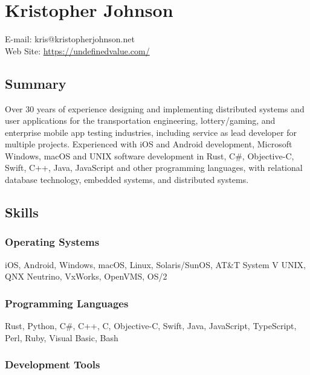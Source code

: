 \hypertarget{kristopher-johnson}{%
\section{Kristopher Johnson}\label{kristopher-johnson}}

E-mail: kris@kristopherjohnson.net\\
Web Site: \url{https://undefinedvalue.com/}

\hypertarget{summary}{%
\subsection{Summary}\label{summary}}

Over 30 years of experience designing and implementing distributed
systems and user applications for the transportation engineering,
lottery/gaming, and enterprise mobile app testing industries, including
service as lead developer for multiple projects. Experienced with iOS
and Android development, Microsoft Windows, macOS and UNIX software
development in Rust, C\#, Objective-C, Swift, C++, Java, JavaScript and
other programming languages, with relational database technology,
embedded systems, and distributed systems.

\hypertarget{skills}{%
\subsection{Skills}\label{skills}}

\hypertarget{operating-systems}{%
\subsubsection{Operating Systems}\label{operating-systems}}

iOS, Android, Windows, macOS, Linux, Solaris/SunOS, AT\&T System V UNIX,
QNX Neutrino, VxWorks, OpenVMS, OS/2

\hypertarget{programming-languages}{%
\subsubsection{Programming Languages}\label{programming-languages}}

Rust, Python, C\#, C++, C, Objective-C, Swift, Java, JavaScript,
TypeScript, Perl, Ruby, Visual Basic, Bash

\hypertarget{development-tools}{%
\subsubsection{Development Tools}\label{development-tools}}

